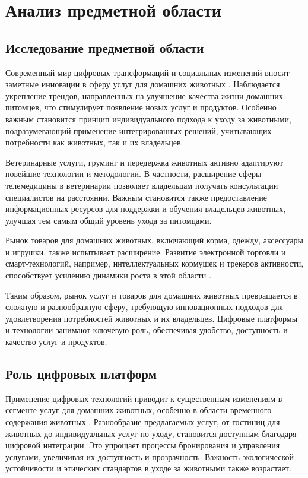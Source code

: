 \section{Анализ предметной области}

\subsection{Исследование предметной области}

Современный мир цифровых трансформаций и социальных изменений вносит заметные инновации в сферу услуг для домашних животных \cite{freedman}. Наблюдается укрепление трендов, направленных на улучшение качества жизни домашних питомцев, что стимулирует появление новых услуг и продуктов. Особенно важным становится принцип индивидуального подхода к уходу за животными, подразумевающий применение интегрированных решений, учитывающих потребности как животных, так и их владельцев.

Ветеринарные услуги, груминг и передержка животных активно адаптируют новейшие технологии и методологии. В частности, расширение сферы телемедицины в ветеринарии позволяет владельцам получать консультации специалистов на расстоянии. Важным становится также предоставление информационных ресурсов для поддержки и обучения владельцев животных, улучшая тем самым общий уровень ухода за питомцами.

Рынок товаров для домашних животных, включающий корма, одежду, аксессуары и игрушки, также испытывает расширение. Развитие электронной торговли и смарт-технологий, например, интеллектуальных кормушек и трекеров активности, способствует усилению динамики роста в этой области \cite{market}.

Таким образом, рынок услуг и товаров для домашних животных превращается в сложную и разнообразную сферу, требующую инновационных подходов для удовлетворения потребностей животных и их владельцев. Цифровые платформы и технологии занимают ключевую роль, обеспечивая удобство, доступность и качество услуг и продуктов.

\subsection{Роль цифровых платформ}

Применение цифровых технологий приводит к существенным изменениям в сегменте услуг для домашних животных, особенно в области временного содержания животных \cite{freedman}. Разнообразие предлагаемых услуг, от гостиниц для животных до индивидуальных услуг по уходу, становится доступным благодаря цифровой интеграции. Это упрощает процессы бронирования и управления услугами, увеличивая их доступность и прозрачность. Важность экологической устойчивости и этических стандартов в уходе за животными также возрастает.

